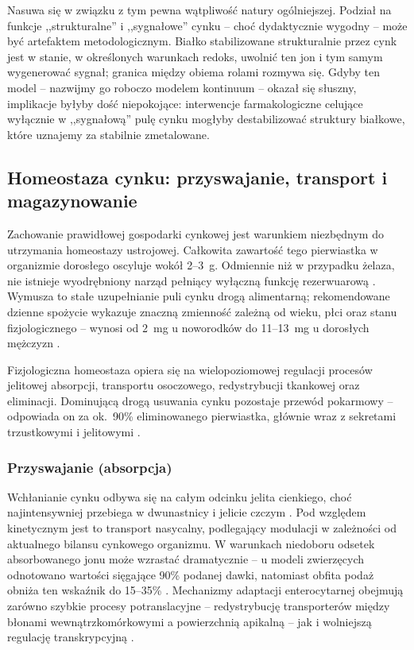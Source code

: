 \documentclass[12pt,a4paper]{article}
\begin{document}
Nasuwa się w związku z tym pewna wątpliwość natury ogólniejszej. Podział na funkcje ,,strukturalne'' i ,,sygnałowe'' cynku -- choć dydaktycznie wygodny -- może być artefaktem metodologicznym. Białko stabilizowane strukturalnie przez cynk jest w stanie, w określonych warunkach redoks, uwolnić ten jon i tym samym wygenerować sygnał; granica między obiema rolami rozmywa się. Gdyby ten model -- nazwijmy go roboczo modelem kontinuum -- okazał się słuszny, implikacje byłyby dość niepokojące: interwencje farmakologiczne celujące wyłącznie w ,,sygnałową'' pulę cynku mogłyby destabilizować struktury białkowe, które uznajemy za stabilnie zmetalowane.

\subsection{Homeostaza cynku: przyswajanie, transport i magazynowanie}

Zachowanie prawidłowej gospodarki cynkowej jest warunkiem niezbędnym do utrzymania homeostazy ustrojowej. Całkowita zawartość tego pierwiastka w organizmie dorosłego oscyluje wokół 2--3~g. Odmiennie niż w przypadku żelaza, nie istnieje wyodrębniony narząd pełniący wyłączną funkcję rezerwuarową \cite{hara2017, stiles2024}. Wymusza to stałe uzupełnianie puli cynku drogą alimentarną; rekomendowane dzienne spożycie wykazuje znaczną zmienność zależną od wieku, płci oraz stanu fizjologicznego -- wynosi od 2~mg u noworodków do 11--13~mg u dorosłych mężczyzn \cite{stiles2024}.

Fizjologiczna homeostaza opiera się na wielopoziomowej regulacji procesów jelitowej absorpcji, transportu osoczowego, redystrybucji tkankowej oraz eliminacji. Dominującą drogą usuwania cynku pozostaje przewód pokarmowy -- odpowiada on za ok.\ 90\% eliminowanego pierwiastka, głównie wraz z sekretami trzustkowymi i jelitowymi \cite{maares2020}.

\subsubsection*{Przyswajanie (absorpcja)}

Wchłanianie cynku odbywa się na całym odcinku jelita cienkiego, choć najintensywniej przebiega w dwunastnicy i jelicie czczym \cite{maares2020, stiles2024}. Pod względem kinetycznym jest to transport nasycalny, podlegający modulacji w zależności od aktualnego bilansu cynkowego organizmu. W warunkach niedoboru odsetek absorbowanego jonu może wzrastać dramatycznie -- u modeli zwierzęcych odnotowano wartości sięgające 90\% podanej dawki, natomiast obfita podaż obniża ten wskaźnik do 15--35\% \cite{hara2017, maares2020}. Mechanizmy adaptacji enterocytarnej obejmują zarówno szybkie procesy potranslacyjne -- redystrybucję transporterów między błonami wewnątrzkomórkowymi a powierzchnią apikalną -- jak i wolniejszą regulację transkrypcyjną \cite{kambe2015}.
\end{document}
